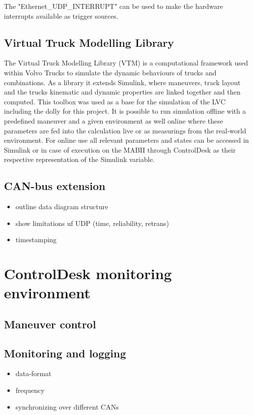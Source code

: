 \documentclass[ExampleMasters.tex]{subfiles}
\begin{document}
The "Ethernet\_UDP\_INTERRUPT" can be used to make the hardware interrupts available as trigger sources.
\subsection{Virtual Truck Modelling Library}
\label{sec:VTM}
The Virtual Truck Modelling Library (VTM) is a computational framework used within Volvo Trucks to simulate the dynamic behaviours of trucks and combinations. As a library it extends Simulink, where maneuvers, track layout and the trucks kinematic and dynamic properties are linked together and then computed. This toolbox was used as a base for the simulation of the LVC including the dolly for this project. It is possible to run simulation offline with a predefined maneuver and a given environment as well online where these parameters are fed into the calculation live or as measurings from the real-world environment. For online use all relevant parameters and states can be accessed in Simulink or in case of execution on the MABII through ControlDesk as their respective representation of the Simulink variable. 

\subsection{CAN-bus extension}
\label{sec:can_bus_extension_software}

\begin{itemize}
	\item outline data diagram structure
	\item show limitations uf UDP (time, reliability, retrans)
	\item timestamping
	
	
\end{itemize}


\section{ControlDesk monitoring environment}
\label{sec:control_desk}
\subsection{Maneuver control}


\subsection{Monitoring and logging}
\begin{itemize}
	\item data-format
	\item frequency
	\item synchronizing over different CANs	
\end{itemize}
\end{document}
